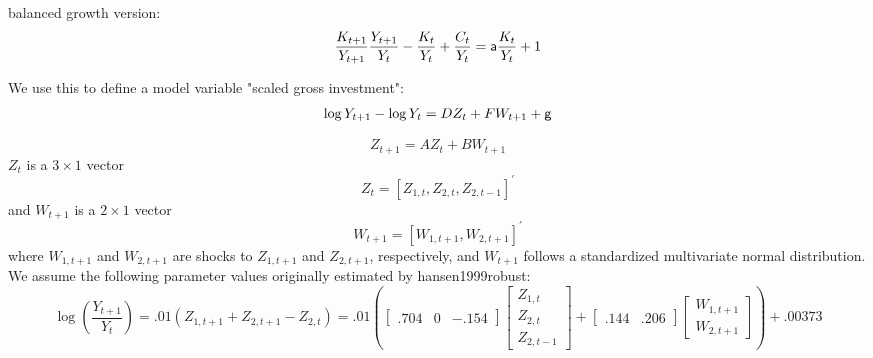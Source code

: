 \documentclass{article}
\theoremstyle{exampstyle}
\begin{document}
balanced growth version:
\begin{equation}\label{key}
	    \frac{K_{t+1}}{Y_{t+1}} \frac{Y_{t+1}}{Y_t} -\frac{K_t}{Y_t} + \frac{C_t}{Y_t} = {\sf a} \frac{K_t}{Y_t} + 1
\end{equation}


We use this to define a model variable "scaled gross investment":
\begin{equation}\label{key}
	   \log Y_{t+1} - \log Y_t = D{Z_t} + FW_{t+1} + {\sf{g}}
\end{equation}

\begin{equation}\label{key}
	    Z_{t+1} = AZ_t + BW_{t+1}
\end{equation}
$Z_t$ is a $3 \times 1$ vector 
\begin{equation}\label{key}
	    Z_t = \left[Z_{1,t}, Z_{2,t}, Z_{2,t-1}\right]^{\prime}
\end{equation}
and $W_{t+1}$ is a $2 \times 1$ vector
\begin{equation}\label{key}
	 W_{t+1} = \left[W_{1,t+1}, W_{2,t+1}\right]^{\prime}
\end{equation}
where $W_{1,t+1}$ and $W_{2,t+1}$ are shocks to $Z_{1,t+1}$ and $Z_{2,t+1}$, respectively, and $W_{t+1}$  follows a standardized multivariate normal distribution.
We assume the following parameter values originally estimated by hansen1999robust:
\begin{equation}\label{key}
	  \log\left(\frac{Y_{t+1}}{Y_t}\right) = .01(Z_{1,t+1}+Z_{2,t+1}-Z_{2,t}) = .01\left(\begin{bmatrix} .704 & 0 & -.154\end{bmatrix} \begin{bmatrix} Z_{1,t}\\Z_{2,t}\\Z_{2,t-1}\end{bmatrix} + \begin{bmatrix}.144 & .206\end{bmatrix} \begin{bmatrix}W_{1,t+1}\\W_{2,t+1} \end{bmatrix}\right) + .00373
\end{equation}
\end{document}
